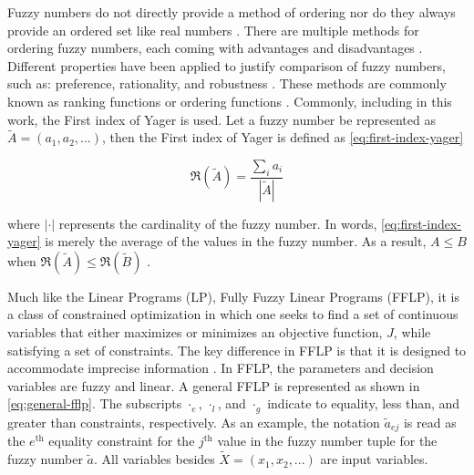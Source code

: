 \documentclass[ee,thesis]{usuthesis}
\begin{document}
\label{sec:comparing-fuzzy-numbers}

Fuzzy numbers do not directly provide a method of ordering nor do they always provide an ordered set like real numbers
\cite{bello-2019-fuzzy-activ}. There are multiple methods for ordering fuzzy numbers, each coming with advantages and
disadvantages \cite{mccahon-1990-compar}. Different properties have been applied to justify comparison of fuzzy
numbers, such as: preference, rationality, and robustness
\cite{jimenez-2007-linear-progr,bello-2019-fuzzy-activ,kaur-2016-introd-fuzzy}. These methods are commonly known as
ranking functions or ordering functions \cite{bello-2019-fuzzy-activ,das-2016-mathem-model,kaur-2016-introd-fuzzy}.
Commonly, including in this work, the First index of Yager \cite{yager-1981-proced-order} is used. Let a fuzzy number
be represented as \(\tilde{A} = (a_1,a_2,...)\), then the First index of Yager is defined as \ref{eq:first-index-yager}

\begin{equation}
\label{eq:first-index-yager}
\mathfrak{R}(\tilde{A}) = \frac{\sum_i a_i}{|\tilde{A}|}
\end{equation}

\noindent where \(|\cdot|\) represents the cardinality of the fuzzy number. In words, \ref{eq:first-index-yager} is merely the
average of the values in the fuzzy number. As a result, \(A \le B\) when \(\mathfrak{R}(\tilde{A}) \le \mathfrak{R}(\tilde{B})\)
\cite{bello-2019-fuzzy-activ}.

\label{sec:fully-fuzzy-linear-programming}

Much like the Linear Programs (LP), Fully Fuzzy Linear Programs (FFLP), it is a class of constrained optimization in
which one seeks to find a set of continuous variables that either maximizes or minimizes an objective function, \(J\),
while satisfying a set of constraints. The key difference in FFLP is that it is designed to accommodate imprecise
information \cite{bello-2019-fuzzy-activ,kaur-2016-introd-fuzzy}. In FFLP, the parameters and decision variables are
fuzzy and linear. A general FFLP is represented as shown in \ref{eq:general-fflp}. The subscripts \(\cdot_e\), \(\cdot_l\), and \(\cdot_g\)
indicate to equality, less than, and greater than constraints, respectively. As an example, the notation
\(\tilde{a}_{ej}\) is read as the \(e^{\text{th}}\) equality constraint for the \(j^{\text{th}}\) value in the fuzzy number
tuple for the fuzzy number \(\tilde{a}\). All variables besides \(\tilde{X} = (x_1, x_2, ...)\) are input variables.
\end{document}

